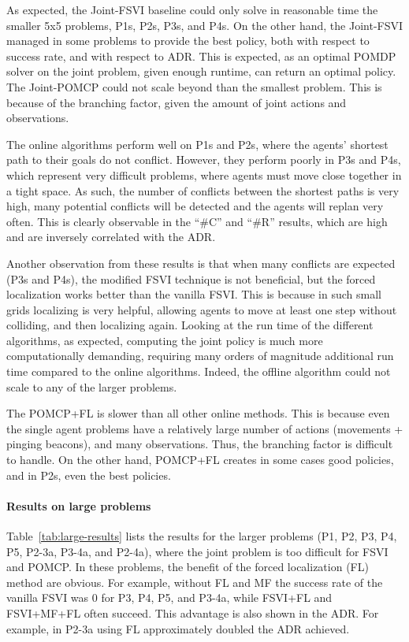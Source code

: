 \documentclass[letterpaper]{article} %
\begin{document}
As expected, the Joint-FSVI baseline could only solve in reasonable time the smaller 5x5 problems, P1s, P2s, P3s, and P4s. On the other hand, the Joint-FSVI managed in some problems to provide the best policy, both with respect to success rate, and with respect to ADR. This is expected, as an optimal POMDP solver on the joint problem, given enough runtime, can return an optimal policy. 
The Joint-POMCP could not scale beyond than the smallest problem. This is because of the branching factor, given the amount of joint actions and observations.



The online algorithms perform well on P1s and P2s, where the agents' shortest path to their goals do not conflict. 
However, they perform poorly in P3s and P4s, which represent very difficult problems, where agents must move close together in a tight space. As such, the number of conflicts between the shortest paths is very high, many potential conflicts will be detected and the agents will replan very often. This is clearly observable in the ``\#C'' and ``\#R'' results, which are high and are inversely correlated with the ADR.

Another observation from these results is that when many conflicts are expected (P3s and P4s), the modified FSVI technique is not beneficial, but the forced localization works better than the vanilla FSVI. 
This is because in such small grids localizing is very helpful, allowing agents to move at least one step without colliding, and then localizing again. 
Looking at the run time of the different algorithms, as expected, computing the joint policy is much more computationally demanding, requiring many orders of magnitude additional run time compared to the online algorithms. Indeed, the offline algorithm could not scale to any of the larger problems. 

The POMCP+FL is slower than all other online methods. This is because even the single agent problems have a relatively large number of actions (movements + pinging beacons), and many observations. Thus, the branching factor is difficult to handle. On the other hand, POMCP+FL creates in some cases good policies, and in P2s, even the best policies.






\paragraph{Results on large problems}
Table~\ref{tab:large-results} lists the results for the larger problems (P1, P2, P3, P4, P5, P2-3a, P3-4a, and P2-4a), where the joint problem is too difficult for FSVI and POMCP. 
In these problems, the benefit of the forced localization (FL) method are obvious. 
For example, without FL and MF the success rate of the vanilla FSVI was 0 for P3, P4, P5, and P3-4a, while 
FSVI+FL and FSVI+MF+FL often succeed. This advantage is also shown in the ADR. 
For example, in P2-3a using FL approximately doubled the ADR achieved. 
\end{document}

